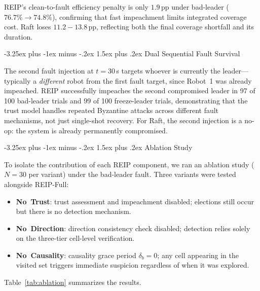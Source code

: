 \documentclass[conference]{IEEEtran}
\makeatletter
\renewcommand{\subsection}{\@startsection{subsection}{2}{\z@}%
  {-3.25ex plus -1ex minus -.2ex}%
  {1.5ex plus .2ex}%
  {\normalfont\normalsize\itshape\centering}}
\makeatother
\begin{document}
REIP's clean-to-fault efficiency penalty is only $1.9\,$pp under bad-leader ($76.7\% \to 74.8\%$), confirming that fast impeachment limits integrated coverage cost. Raft loses $11.2{-}13.8\,$pp, reflecting both the final coverage shortfall and its duration.

\subsection{Dual Sequential Fault Survival}

The second fault injection at $t{=}30\,$s targets whoever is currently the leader---typically a \emph{different} robot from the first fault target, since Robot~1 was already impeached. REIP successfully impeaches the second compromised leader in 97 of 100 bad-leader trials and 99 of 100 freeze-leader trials, demonstrating that the trust model handles repeated Byzantine attacks across different fault mechanisms, not just single-shot recovery. For Raft, the second injection is a no-op: the system is already permanently compromised.

\subsection{Ablation Study}
\label{sec:ablation}

To isolate the contribution of each REIP component, we ran an ablation study ($N{=}30$ per variant) under the bad-leader fault. Three variants were tested alongside REIP-Full:
\begin{itemize}
    \item \textbf{No~Trust}: trust assessment and impeachment disabled; elections still occur but there is no detection mechanism.
    \item \textbf{No~Direction}: direction consistency check disabled; detection relies solely on the three-tier cell-level verification.
    \item \textbf{No~Causality}: causality grace period $\delta_b = 0$; any cell appearing in the visited set triggers immediate suspicion regardless of when it was explored.
\end{itemize}

Table~\ref{tab:ablation} summarizes the results.
\end{document}
